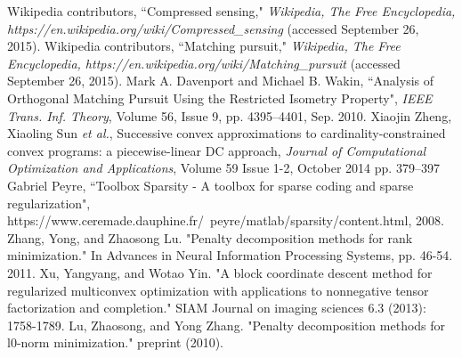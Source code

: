 \documentclass[letterpaper, 10 pt, conference]{article}
\begin{document}
\begin{thebibliography}{99}
 Wikipedia contributors, ``Compressed sensing," \textit{Wikipedia, The Free Encyclopedia, https://en.wikipedia.org/wiki/Compressed\_sensing} (accessed September 26, 2015).
 Wikipedia contributors, ``Matching pursuit," \textit{Wikipedia, The Free Encyclopedia, https://en.wikipedia.org/wiki/Matching\_pursuit} (accessed September 26, 2015).
 Mark A. Davenport and Michael B. Wakin, ``Analysis of Orthogonal Matching Pursuit Using the Restricted Isometry Property", \textit{IEEE Trans. Inf. Theory}, Volume 56,  Issue 9, pp. 4395--4401, Sep. 2010.
 	Xiaojin Zheng, Xiaoling Sun \textit{et al.}, Successive convex approximations to cardinality-constrained convex programs: a piecewise-linear DC approach, \textit{Journal of Computational Optimization and Applications}, Volume 59 Issue 1-2, October 2014 pp. 379--397
 Gabriel Peyre, ``Toolbox Sparsity - A toolbox for sparse coding and sparse regularization", https://www.ceremade.dauphine.fr/~peyre/matlab/sparsity/content.html, 2008.
 Zhang, Yong, and Zhaosong Lu. "Penalty decomposition methods for rank minimization." In Advances in Neural Information Processing Systems, pp. 46-54. 2011.
 Xu, Yangyang, and Wotao Yin. "A block coordinate descent method for regularized multiconvex optimization with applications to nonnegative tensor factorization and completion." SIAM Journal on imaging sciences 6.3 (2013): 1758-1789.
 Lu, Zhaosong, and Yong Zhang. "Penalty decomposition methods for l0-norm minimization." preprint (2010).
\end{thebibliography}
\end{document}
